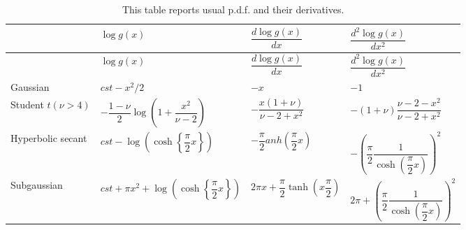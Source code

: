 \documentclass[
  11pt,
]{book}
\theoremstyle{definition}
\theoremstyle{definition}
\theoremstyle{definition}
\theoremstyle{definition}
\theoremstyle{remark}
\begin{document}
\begin{longtable}[]{@{}
  >{\raggedright\arraybackslash}p{}
  >{\raggedright\arraybackslash}p{}
  >{\raggedright\arraybackslash}p{}
  >{\raggedright\arraybackslash}p{}@{}}
\caption{\label{tab:distriICA} This table reports usual p.d.f. and their derivatives.}\tabularnewline
\toprule\noalign{}
\begin{minipage}[b]{\linewidth}\raggedright
\end{minipage} & \begin{minipage}[b]{\linewidth}\raggedright
\(\log g(x)\)
\end{minipage} & \begin{minipage}[b]{\linewidth}\raggedright
\(\dfrac{d \log g(x)}{d x}\)
\end{minipage} & \begin{minipage}[b]{\linewidth}\raggedright
\(\dfrac{d^2 \log g(x)}{d x^2}\)
\end{minipage} \\
\midrule\noalign{}
\endfirsthead
\toprule\noalign{}
\begin{minipage}[b]{\linewidth}\raggedright
\end{minipage} & \begin{minipage}[b]{\linewidth}\raggedright
\(\log g(x)\)
\end{minipage} & \begin{minipage}[b]{\linewidth}\raggedright
\(\dfrac{d \log g(x)}{d x}\)
\end{minipage} & \begin{minipage}[b]{\linewidth}\raggedright
\(\dfrac{d^2 \log g(x)}{d x^2}\)
\end{minipage} \\
\midrule\noalign{}
\endhead
\bottomrule\noalign{}
\endlastfoot
Gaussian & \(cst - x^2/2\) & \(-x\) & \(-1\) \\
Student \(t(\nu>4)\) & \(-\dfrac{1-\nu}{2}\log\left( 1 +\dfrac{x^2}{\nu-2} \right)\) & \(-\dfrac{x(1+\nu)}{\nu - 2 + x^2}\) & \(- (1+\nu)  \dfrac{\nu - 2 - x^2}{\nu - 2 + x^2}\) \\
Hyperbolic secant & \(cst - \log\left( \cosh\left\{\dfrac{\pi}{2}x\right\} \right)\) & \(-\dfrac{\pi}{2}   anh\left(\dfrac{\pi}{2}x\right)\) & \(-\left(\dfrac{\pi}{2}\dfrac{1}{\cosh\left(\dfrac{\pi}{2}x\right)}\right)^2\) \\
Subgaussian & \(cst + \pi x^2 + \log \left(\cosh\left\{\dfrac{\pi}{2}x\right\}\right)\) & \(2\pi x+\dfrac{\pi}{2}\tanh\left(x \dfrac{\pi}{2}\right)\) & \(2\pi +\left(\dfrac{\pi}{2}\dfrac{1}{\cosh\left(\dfrac{\pi}{2}x\right)}\right)^2\) \\
\end{longtable}
\end{document}
